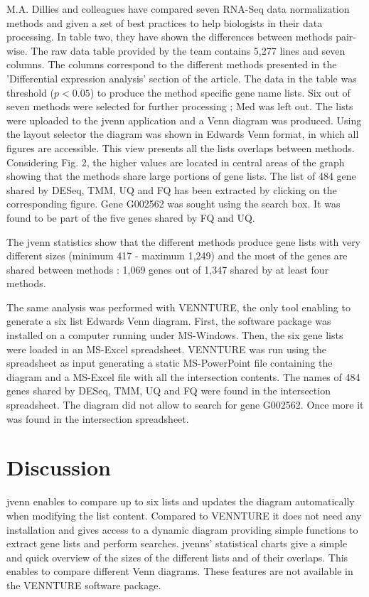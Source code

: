 \documentclass{bmcart}
\begin{document}
M.A. Dillies and colleagues \cite{Dillies2012} have compared seven RNA-Seq data
normalization methods and given a set of best practices to help biologists in their 
data processing. In table two, they have shown the differences between methods
pair-wise. The raw data table provided by the team contains 5,277 lines and
seven columns. The columns correspond to  the different methods presented in the
'Differential expression analysis' section of the article. The data in the table
was threshold ($p < 0.05$) to produce the method specific gene name lists. Six
out of seven methods were selected for further processing ; Med was left out.
The lists were uploaded to the jvenn application and a Venn diagram was
produced. Using the layout selector the diagram was shown in Edwards Venn
format, in which all figures are accessible. This view presents all the lists
overlaps between methods. Considering Fig. 2, the higher values are located in
central areas of the graph showing that the methods share large portions of gene
lists. The list of 484 gene shared by DESeq, TMM, UQ and FQ has been extracted
by clicking on the corresponding figure. Gene G002562 was sought using the
search box. It was found to be part of the five genes shared by FQ and UQ. 

The jvenn statistics show that the different methods produce gene lists with
very different sizes (minimum 417 - maximum 1,249) and the most of the genes are
shared between methods : 1,069 genes out of 1,347 shared by at least four methods.

The same analysis was performed with VENNTURE, the only tool enabling to
generate a six list Edwards Venn diagram. First, the software package was
installed on a computer running under MS-Windows. Then, the six gene lists were loaded
in an MS-Excel spreadsheet. VENNTURE was run using the spreadsheet as input
generating a static MS-PowerPoint file containing the diagram and a MS-Excel
file with all the intersection contents. The names of 484 genes shared by DESeq,
TMM, UQ and FQ  were found in the intersection spreadsheet. The diagram did not
allow to search for gene G002562. Once more it was found in the intersection
spreadsheet.

\section*{Discussion}

jvenn enables to compare up to six lists and updates the diagram automatically
when modifying the list content. Compared to VENNTURE it does not need any
installation and gives access to a dynamic diagram providing simple functions to
extract gene lists and perform searches. 
jvenns' statistical charts give a simple and quick overview of the sizes of the
different lists and of their overlaps. This enables to compare different Venn diagrams.
These features are not available in the VENNTURE software package.
\end{document}
